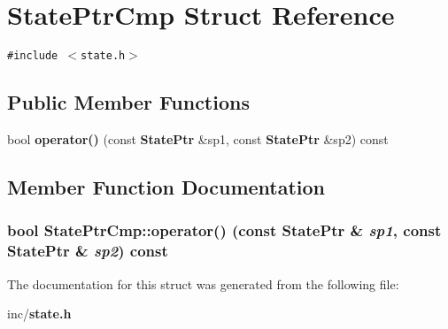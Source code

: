 \section{StatePtrCmp Struct Reference}
\label{structStatePtrCmp}
{\tt \#include $<$state.h$>$}

\subsection*{Public Member Functions}
\begin{CompactItemize}
\item 
bool {\bf operator()} (const {\bf StatePtr} \&sp1, const {\bf StatePtr} \&sp2) const
\end{CompactItemize}


\subsection{Member Function Documentation}
\subsubsection{\setlength{\rightskip}{0pt plus 5cm}bool StatePtrCmp::operator() (const {\bf StatePtr} \& {\em sp1}, const {\bf StatePtr} \& {\em sp2}) const\hspace{0.3cm}{\tt  [inline]}}\label{structStatePtrCmp_d5c4022bf6d89676239513e6e228833f}




The documentation for this struct was generated from the following file:\begin{CompactItemize}
\item 
inc/{\bf state.h}\end{CompactItemize}
